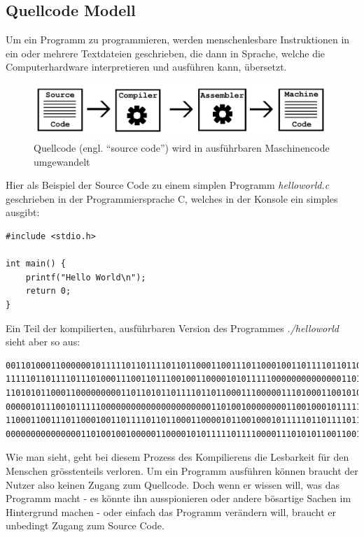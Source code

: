 \documentclass[a4paper,11pt]{article}
\begin{document}
\subsection{Quellcode Modell}
Um ein Programm zu programmieren, werden menschenlesbare Instruktionen in ein oder mehrere Textdateien geschrieben,
die dann in Sprache, welche die Computerhardware interpretieren und ausführen kann, übersetzt.

\begin{figure}[H]
    \centering
    \includegraphics[width=.8\textwidth]{media/Source2Executable.jpg}
    \caption{Quellcode (engl. ``source code'') wird in ausführbaren Maschinencode umgewandelt \cite{stallman2002}}
\end{figure}

Hier als Beispiel der Source Code zu einem simplen Programm \textit{helloworld.c} geschrieben in der Programmiersprache C, welches in der Konsole ein simples  ausgibt:

\lstset{language=C}
\begin{lstlisting}
#include <stdio.h>

int main() {
    printf("Hello World\n");
    return 0;
}
\end{lstlisting}

Ein Teil der kompilierten, ausführbaren Version des Programmes \textit{./helloworld} sieht aber so aus:
\begin{lstlisting}
0011010001100000010111110110111101101100011001110110001001101111011011000110000101100100010
1111101101111011101000111001101110010011000010101111100000000000000110100011100000111100001
1101010110001100000000011011010110111101101100011100000111010001100101011001000110010100110
0000010111001011111000000000000000000000011010010000000011001000101111101011111011011110110
1100011001110110001001101111011011000110000101100100010111110110111101110100011100110111001
0000000000000001101001001000001100001010111110111100001110101011001100101111101101110011010
\end{lstlisting}

Wie man sieht, geht bei diesem Prozess des Kompilierens die Lesbarkeit für den Menschen grösstenteils verloren. Um ein Programm ausführen können braucht der Nutzer also keinen Zugang zum Quellcode. Doch wenn er wissen will, was das Programm macht - es könnte ihn ausspionieren oder andere bösartige Sachen im Hintergrund machen - oder einfach das Programm verändern will, braucht er unbedingt Zugang zum Source Code.\\
\end{document}
